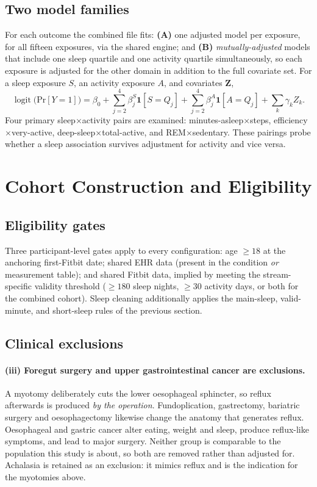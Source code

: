 \documentclass[11pt]{article}
\DeclareMathOperator{\logit}{logit}
\newcommand{\ind}{\mathbf{1}}}
\providecommand{\Pr}{\mathrm{Pr}}
\begin{document}
\subsection{Two model families}
For each outcome the combined file fits: \textbf{(A)} one adjusted model per exposure, for all fifteen
exposures, via the shared engine; and \textbf{(B)} \emph{mutually-adjusted} models that include one
sleep quartile and one activity quartile simultaneously, so each exposure is adjusted for the other
domain in addition to the full covariate set. For a sleep exposure $S$, an activity exposure $A$, and
covariates $\mathbf{Z}$,
\[
\logit\!\big(\Pr[Y=1]\big) = \beta_0 + \sum_{j=2}^{4}\beta^S_j \ind[S{=}Q_j]
+ \sum_{j=2}^{4}\beta^A_j \ind[A{=}Q_j] + \sum_k \gamma_k Z_k .
\]
Four primary sleep$\times$activity pairs are examined: minutes-asleep$\times$steps,
efficiency$\times$very-active, deep-sleep$\times$total-active, and REM$\times$sedentary. These pairings
probe whether a sleep association survives adjustment for activity and vice versa.

\section{Cohort Construction and Eligibility}

\subsection{Eligibility gates}
Three participant-level gates apply to every configuration: age $\geq 18$ at the anchoring first-Fitbit
date; shared EHR data (present in the condition \emph{or} measurement table); and shared Fitbit data,
implied by meeting the stream-specific validity threshold ($\geq 180$ sleep nights, $\geq 30$ activity
days, or both for the combined cohort). Sleep cleaning additionally applies the main-sleep,
valid-minute, and short-sleep rules of the previous section.

\subsection{Clinical exclusions}
\paragraph{(iii) Foregut surgery and upper gastrointestinal cancer are exclusions.}
A myotomy deliberately cuts the lower oesophageal sphincter, so reflux afterwards
is produced \emph{by the operation}. Fundoplication, gastrectomy, bariatric
surgery and oesophagectomy likewise change the anatomy that generates reflux.
Oesophageal and gastric cancer alter eating, weight and sleep, produce
reflux-like symptoms, and lead to major surgery. Neither group is comparable to
the population this study is about, so both are removed rather than adjusted for.
Achalasia is retained as an exclusion: it mimics reflux and is the indication for
the myotomies above.
\end{document}

